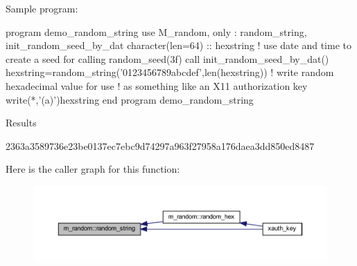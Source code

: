 \begin{DoxyVerb}Sample program:

 program demo_random_string
 use M_random, only : random_string, init_random_seed_by_dat
    character(len=64) :: hexstring
    ! use date and time to create a seed for calling random_seed(3f)
    call init_random_seed_by_dat()
    hexstring=random_string('0123456789abcdef',len(hexstring))
    ! write random hexadecimal value for use
    ! as something like an X11 authorization key
    write(*,'(a)')hexstring
 end program demo_random_string

Results

 2363a3589736e23be0137ec7ebc9d74297a963f27958a176daea3dd850ed8487 \end{DoxyVerb}
 Here is the caller graph for this function\+:
\nopagebreak
\begin{figure}[H]
\begin{center}
\leavevmode
\includegraphics[width=350pt]{namespacem__random_aec553bcbd72af521bc24d9f81aea5652_icgraph}
\end{center}
\end{figure}
